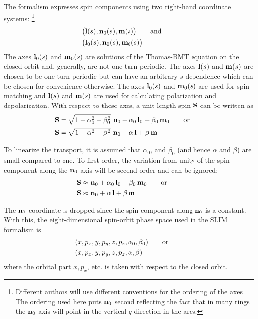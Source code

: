 {The  formalism expresses spin components using two right-hand coordinate systems:
\footnote{Different authors will use different conventions for the ordering of the axes
The ordering used here puts ${\bf n}_0$ second reflecting the fact that in many rings the ${\bf n}_0$
axis will point in the vertical $y$-direction in the arcs.}
\begin{align}
  &\big( {\bf l}(s), {\bf n}_0(s), {\bf m}(s) \big)
  \qquad \text{and} \qquad \nonumber \\
  &\big( {\bf l}_0(s), {\bf n}_0(s), {\bf m}_0(s) \big)
\end{align}
The axes ${\bf l}_0(s)$ and ${\bf m}_0(s)$ are solutions of the Thomas-BMT equation on the closed orbit
and, generally, are not one-turn periodic. The axes ${\bf l}(s)$ and ${\bf m}(s)$ are chosen to be
one-turn periodic but can have an arbitrary $s$ dependence which can be chosen for convenience
otherwise. The axes ${\bf l}_0(s)$ and ${\bf m}_0(s)$ are used for spin-matching and ${\bf l}(s)$ and
${\bf m}(s)$ are used for calculating polarization and depolarization.  With respect to these axes, a
unit-length spin ${\bf S}$ can be written as
\begin{align}
  {\bf S} &= \sqrt{1- \alpha_0^2 - \beta_0^2} ~{\bf n}_0 + \alpha_0 \, {\bf l}_0 + \beta_0 \, {\bf m}_0 
  \qquad \text{or} \qquad \nonumber \\
  {\bf S} &= \sqrt{1- \alpha^2 - \beta^2} ~{\bf n}_0 + \alpha \, {\bf l} + \beta \, {\bf m}
  \label{s1ab}
\end{align}

To linearize the transport, it is assumed that $\alpha_0$, and $\beta_0$ (and hence $\alpha$ and
$\beta$) are small compared to one. To first order, the variation from unity of the spin component
along the ${\bf n}_0$ axis will be second order and can be ignored:
\begin{align}
  {\bf S} &\approx {\bf n}_0 + \alpha_0 \, {\bf l}_0 + \beta_0 \, {\bf m}_0
  \qquad \text{or} \qquad \nonumber \\
  {\bf S} &\approx {\bf n}_0 + \alpha \, {\bf l} + \beta \, {\bf m}
\end{align}

The ${\bf n}_0$ coordinate is dropped since the spin component along ${\bf n}_0$ is a constant. With this,
the eight-dimensional spin-orbit phase space used in the SLIM formalism is
\begin{align}
  &(x, p_x, y, p_y, z, p_z, \alpha_0, \beta_0)
  \qquad \text{or} \qquad \nonumber \\
  &(x, p_x, y, p_y, z, p_z, \alpha, \beta)
  \label{xpxypy}
\end{align}
where the orbital part $x, p_x$, etc. is taken with respect to the closed orbit. 

}
